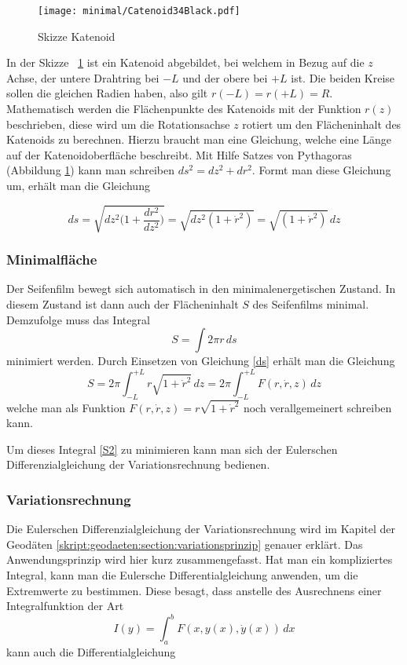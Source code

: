 \begin{refsection}
\begin{figure}
  \centering
  \texttt{[image: minimal/Catenoid34Black.pdf]}
  \caption{Skizze Katenoid} 
  \label{Katenoid}
\end{figure}
In der Skizze ~\ref{Katenoid} ist ein Katenoid abgebildet, bei welchem in Bezug auf die $z$ Achse, der untere Drahtring bei $-L$ und der obere bei $+L$ ist. 
Die beiden Kreise sollen die gleichen Radien haben, also gilt $r(-L)=r(+L)=R$. 
Mathematisch werden die Flächenpunkte des Katenoids mit der Funktion $r(z)$ beschrieben, diese wird um die Rotationsachse $z$ rotiert um den Flächeninhalt des Katenoids zu berechnen.
Hierzu braucht man eine Gleichung, welche eine Länge auf der Katenoidoberfläche beschreibt. 
Mit Hilfe Satzes von Pythagoras (Abbildung \ref{Katenoid}) kann man schreiben $ds^2=dz^2+dr^2$.
Formt man diese Gleichung um, erhält man die Gleichung

\begin{equation} \label{ds}
  ds=\sqrt{dz^2\bigg(1+\frac{dr^2}{dz^2}\bigg)}= \sqrt{dz^2(1+\dot r^2)}=\sqrt{(1+\dot r^2)}\,dz
\end{equation}
\subsubsection{Minimalfläche}
Der Seifenfilm bewegt sich automatisch in den minimalenergetischen Zustand. 
In diesem Zustand ist dann auch der Flächeninhalt $S$ des Seifenfilms minimal.
Demzufolge muss das Integral 
\begin{equation} \label{S1}  
  S= \int 2 \pi r \,ds 
\end{equation}
minimiert werden. 
Durch Einsetzen von Gleichung \eqref{ds} erhält man die Gleichung 
\begin{equation} \label{S2}
  S=2 \pi \int_{-L}^{+L} r\sqrt{1+\dot r^2}\,dz =2 \pi \int_{-L}^{+L}  F(r,\dot r, z) \,dz 
\end{equation}
welche man als Funktion $F(r,\dot r, z) = r \sqrt{1+\dot r^2}$ noch verallgemeinert schreiben kann.



Um dieses Integral \eqref{S2} zu minimieren kann man sich der Eulerschen Differenzialgleichung der Variationsrechnung bedienen. 
\subsubsection{Variationsrechnung}
Die Eulerschen Differenzialgleichung der Variationsrechnung wird im Kapitel der Geodäten \ref{skript:geodaeten:section:variationsprinzip} genauer erklärt.
Das Anwendungsprinzip wird hier kurz zusammengefasst. Hat man ein kompliziertes Integral, kann man die Eulersche Differentialgleichung anwenden, um die Extremwerte zu bestimmen. Diese besagt, dass anstelle des Ausrechnens  einer Integralfunktion der Art \begin{equation} \label{E_DGL1}  
  I(y)= \int_a^b F(x,y(x),\dot y(x))\,dx       
\end{equation}
kann auch die Differentialgleichung  




\end{refsection}
